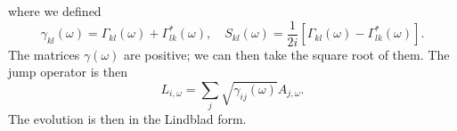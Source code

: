 \documentclass{SciPost}
\begin{document}
where we defined 
\begin{equation}
	\gamma_{kl}(\omega) = \Gamma_{kl}(\omega) +\Gamma^*_{lk}(\omega),\quad 
	S_{kl}(\omega) = \frac{1}{2i}[\Gamma_{kl}(\omega) - \Gamma^*_{lk}(\omega)].
\end{equation}
The matrices $\gamma(\omega)$ are positive; we can then take the square root of them. The jump operator is then 
$$L_{i,\omega} = \sum_j \sqrt{\gamma_{ij}(\omega)}A_{j,\omega}.$$ 
The evolution is then in the Lindblad form.












%

\end{document}
